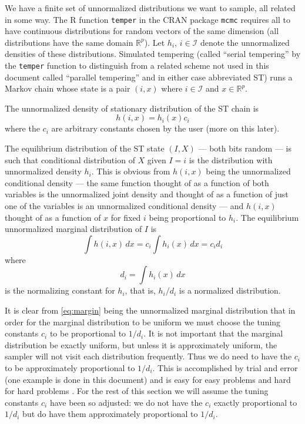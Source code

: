 \documentclass[11pt]{article}
\newcommand{\real}{\mathbb{R}}
\begin{document}
We have a finite set of unnormalized distributions we want to sample,
all related in some way.  The R function \texttt{temper}
in the CRAN package \texttt{mcmc}
requires all to have continuous distributions for random vectors of the same
dimension (all distributions have the same domain $\real^p$).
Let $h_i$, $i \in \mathcal{I}$ denote the unnormalized densities of
these distributions.  Simulated tempering (called ``serial tempering'' by
the \texttt{temper} function to distinguish from a related scheme not used
in this document called ``parallel tempering'' and in either case abbreviated
ST) runs a Markov chain whose
state is a pair $(i, x)$ where $i \in \mathcal{I}$ and $x \in \real^p$.

The unnormalized density of stationary distribution of the ST chain is
\begin{equation} \label{eq:st-joint}
   h(i, x) = h_i(x) c_i
\end{equation}
where the $c_i$ are arbitrary constants chosen by the user (more on this later).

The equilibrium distribution of the ST state $(I, X)$ --- both bits random ---
is such that conditional distribution of $X$ given $I = i$ is the distribution
with unnormalized density $h_i$.  This is obvious from $h(i, x)$ being the
unnormalized conditional density --- the same function thought of as
a function of both variables is the unnormalized joint density and thought
of as a function of just one of the variables is an unnormalized conditional
density --- and $h(i, x)$ thought of as a function of $x$ for fixed $i$ being
proportional to $h_i$.  The equilibrium unnormalized marginal distribution
of $I$ is
\begin{equation} \label{eq:margin}
   \int h(i, x) \, d x = c_i \int h_i(x) \, d x = c_i d_i
\end{equation}
where
$$
   d_i = \int h_i(x) \, d x
$$
is the normalizing constant for $h_i$, that is, $h_i / d_i$ is a normalized
distribution.

It is clear from \eqref{eq:margin} being the unnormalized marginal distribution
that in order for the marginal distribution to be uniform we must choose the
tuning constants $c_i$ to be proportional to $1 / d_i$.  It is not important
that the marginal distribution be exactly uniform, but unless it is
approximately uniform, the sampler will not visit each distribution frequently.
Thus we do need to have the $c_i$ to be approximately proportional to $1 / d_i$.
This is accomplished by trial and
error (one example is done in this document) and is easy for easy problems
and hard for hard problems \citep[have much to say about adjusting
the $c_i$]{geyer-thompson}.  For the rest of this section we will assume
the tuning constants $c_i$ have been so adjusted:
we do not have the $c_i$ exactly proportional to $1 / d_i$ but do have
them approximately proportional to $1 / d_i$.
\end{document}
